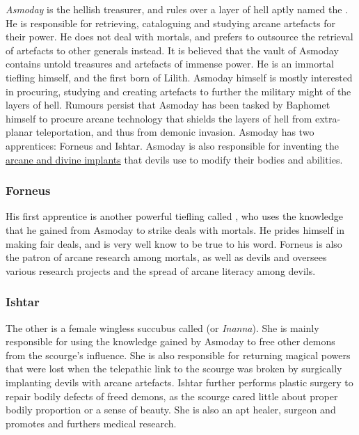 \emph{Asmoday} is the hellish treasurer, and rules over a layer of hell aptly
named the . He is responsible for retrieving,
cataloguing and studying arcane artefacts for their power. He does not deal
with mortals, and prefers to outsource the retrieval of artefacts to other
generals instead. It is believed that the vault of Asmoday contains untold
treasures and artefacts of immense power. He is an immortal tiefling himself,
and the first born of Lilith. Asmoday himself is mostly interested in
procuring, studying and creating artefacts to further the military might of
the layers of hell. Rumours persist that Asmoday has been tasked by Baphomet
himself to procure arcane technology that shields the layers of hell from
extra-planar teleportation, and thus from demonic invasion. Asmoday has two
apprentices: Forneus and Ishtar. Asmoday is also responsible for inventing the
\hyperref[sec:Implants]{arcane and divine implants} that devils use to modify
their bodies and abilities.

\subsubsection{Forneus}

His first apprentice is another powerful tiefling called
, who uses the knowledge that he gained from Asmoday to
strike deals with mortals. He prides himself in making fair deals, and is very
well know to be true to his word. Forneus is also the patron of arcane
research among mortals, as well as devils and oversees various research
projects and the spread of arcane literacy among devils.

\subsubsection{Ishtar}

The other is a female wingless succubus called  (or
\emph{Inanna}). She is mainly responsible for using the knowledge gained by
Asmoday to free other demons from the scourge's influence. She is also
responsible for returning magical powers that were lost when the telepathic
link to the scourge was broken by surgically implanting devils with arcane
artefacts.  Ishtar further performs plastic surgery to repair bodily defects
of freed demons, as the scourge cared little about proper bodily proportion or
a sense of beauty. She is also an apt healer, surgeon and promotes and
furthers medical research.

